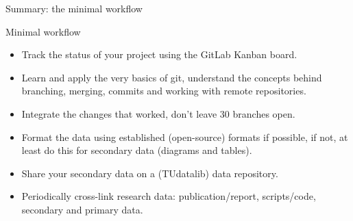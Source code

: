 \documentclass[
	aspectratio=169,%
	color={accentcolor=2d},
	logo=true,%
	colorframetitle=true,%
	]{tudabeamer}
\begin{document}
\begin{frame}{Summary: the minimal workflow} 
    \vfill

    Minimal workflow
    \begin{itemize}
        \item Track the status of your project using the GitLab Kanban board.
        \item Learn and apply the very basics of git, understand the concepts behind branching, merging, commits and working with remote repositories.   
        \item Integrate the changes that worked, don't leave 30 branches open. 
        \item Format the data using established (open-source) formats if possible, if not, at least do this for secondary data (diagrams and tables). 
        \item Share your secondary data on a (TUdatalib) data repository. 
        \item Periodically cross-link research data: publication/report, scripts/code, secondary and primary data. 
    \end{itemize}

\end{frame}

\end{document}
